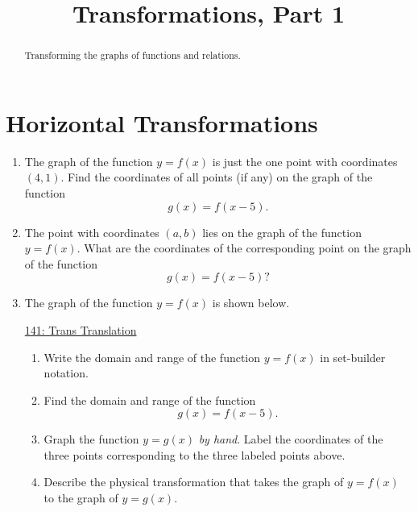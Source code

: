 \documentclass{ximera}
\title{Transformations, Part 1}
\begin{document}
\begin{abstract}
Transforming the graphs of functions and relations.
\end{abstract}
\maketitle

\section{Horizontal Transformations}

\begin{question} \label{QP9erm3}
\begin{enumerate}
\item The graph of the function $y=f(x)$ is just the one point  with coordinates $(4,1)$. Find the coordinates of all points (if any) on the graph of the function
\[
  g(x) = f(x-5).
\]

\item  The point with coordinates $(a,b)$ lies on the graph of the function $y=f(x)$. What are the coordinates of the corresponding point on the graph of the function
\[
    g(x) = f(x-5)?
\]

\item The graph of the function $y=f(x)$ is shown below. 

\begin{onlineOnly}
    \begin{center}
\end{center}
\end{onlineOnly}

\href{https://www.desmos.com/calculator/c5di6pnyda}{141: Trans Translation}

\begin{enumerate}
\item Write the domain and range of the function $y=f(x)$ in set-builder notation.

\item Find the domain and range of the function
\[
  g(x) = f(x-5) .
\]

\item Graph the function $y=g(x)$ \emph{by hand}. Label the coordinates of the three points corresponding to the three labeled points above.

\item Describe the physical transformation that takes the graph of $y=f(x)$ to the graph of $y=g(x)$.
\end{enumerate}
\end{enumerate}
\end{question}
\end{document}
